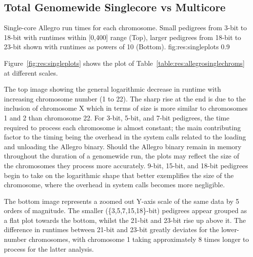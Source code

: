 \subsection{Total Genomewide Singlecore vs Multicore}

	{Single-core Allegro run times for each chromosome. Small pedigrees from 3-bit to 18-bit with runtimes within [0,400] range (Top), larger pedigrees from 18-bit to 23-bit shown with runtimes as powers of 10 (Bottom).}
	{fig:res:singleplots}
	{0.9}

Figure~\ref{fig:res:singleplots} shows the plot of Table~\ref{table:res:allegrosinglechroms} at different scales. 

The top image showing the general logarithmic decrease in runtime with increasing chromosome number (1 to 22). The sharp rise at the end is due to the inclusion of chromosome X which in terms of size is more similar to chromosomes 1 and 2 than chromosome 22. For 3-bit, 5-bit, and 7-bit pedigrees, the time required to process each chromosome is almost constant; the main contributing factor to the timing being the overhead in the system calls related to the loading and unloading the Allegro binary. Should the Allegro binary remain in memory throughout the duration of a genomewide run, the plots may reflect the size of the chromosomes they process more accurately. 9-bit, 15-bit, and 18-bit pedigrees begin to take on the logarithmic shape that better exemplifies the size of the chromosome, where the overhead in system calls becomes more negligible.

The bottom image represents a zoomed out Y-axis scale of the same data by 5 orders of magnitude. The smaller (\{3,5,7,15,18\}-bit) pedigrees appear grouped as a flat plot towards the bottom, whilst the 21-bit and 23-bit rise up above it. The difference in runtimes between 21-bit and 23-bit greatly deviates for the lower-number chromosomes, with chromosome 1 taking approximately 8 times longer to process for the latter analysis.


